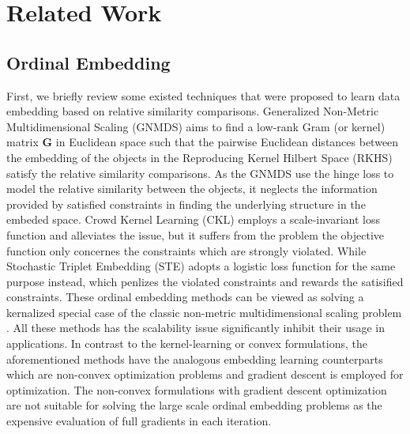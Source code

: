 \documentclass[letterpaper]{article}
\newcommand{\qqxu}[1]{\textcolor[rgb]{0.00,1.00,0.00}{#1}}
\begin{document}
		\section{Related Work}

		\subsection{Ordinal Embedding}

		First, we briefly review some existed techniques that were proposed to learn data embedding based on relative similarity comparisons. Generalized Non-Metric Multidimensional Scaling (GNMDS) \cite{agarwal2007generalized} aims to find a low-rank Gram (or kernel) matrix $\mathbf{G}$ in Euclidean space such that the pairwise Euclidean distances between the embedding of the objects in the Reproducing Kernel Hilbert Space (RKHS) satisfy the relative similarity comparisons. As the GNMDS use the hinge loss to model the relative similarity between the objects, it neglects the information provided by satisfied constraints in finding the underlying structure in the embeded space. Crowd Kernel Learning (CKL) \cite{tamuz2011adaptiive} \qqxu{employs} a scale-invariant loss function and alleviates the issue, but it suffers from the problem the objective function only concernes the constraints which are strongly violated. \qqxu{While} Stochastic Triplet Embedding (STE) \cite{vandermaaten2012stochastic} \qqxu{adopts} a logistic loss function for the same purpose \qqxu{instead}, which penlizes the violated constraints and rewards the satisified constraints. These ordinal embedding methods can be viewed as solving a \qqxu{kernalized} special case of the classic non-metric multidimensional scaling problem \cite{Shepard1962a,Shepard1962b,Kruskal1964a,Kruskal1964b}. All these methods has the scalability issue significantly inhibit their usage in applications. In contrast to the kernel-learning or convex formulations, the aforementioned methods have the analogous embedding learning counterparts which are non-convex optimization problems and gradient descent is employed for optimization. The non-convex formulations with gradient descent optimization are not suitable for solving the large scale ordinal embedding problems as the expensive evaluation of full gradients in each iteration.
\end{document}
